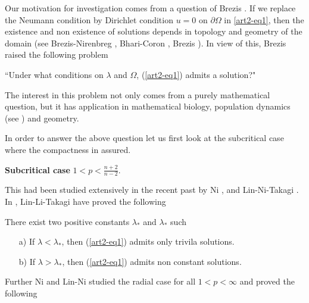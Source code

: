 Our motivation for investigation comes from a question of Brezis \cite{art2-key11}. If we replace the Neumann condition by Dirichlet condition $u=0$ on $\partial\Omega$ in \ref{art2-eq1}, then the existence and non existence of solutions depends in topology and geometry of the domain (see Brezis-Nirenbreg \cite{art2-key14}, Bhari-Coron \cite{art2-key9}, Brezis \cite{art2-key10}). In view of this, Brezis raised the following problem

\begin{center}
``Under what conditions on $\lambda$ and $\Omega$, (\ref{art2-eq1}) admits a solution?"
\end{center}

The interest in this problem not only comes from a purely mathematical question, but it has application in mathematical biology, population dynamics (see \cite{art2-16}) and geometry.

In order to answer the above question let us first look at the subcritical case where the compactness in assured.

\medskip
\noindent\textbf{Subcritical case }$1 < p < \frac{n+2}{n-2}$. 

\medskip
This had been studied extensively in the recent past by Ni \cite{art2-key18}, and Lin-Ni-Takagi \cite{art2-key16}. In \cite{art2-key16}, Lin-Li-Takagi have proved the following

\begin{theorem}\label{art2-thm1}
There exist two positive constants $\lambda_{*}$ and $\lambda_{*}$ such
\begin{itemize}
\item[a)] If $\lambda < \lambda_{*}$, then (\ref {art2-eq1}) admits only trivila solutions.
 \item[b)] If $\lambda > \lambda_{*}$, then (\ref {art2-eq1}) admits non constant solutions.
\end{itemize}

Further Ni \cite{art2-key18} and Lin-Ni \cite{art2-key15} studied the radial case for all $1< p < \infty$ and proved the following 
\end{theorem}

